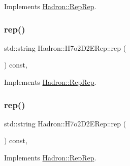 Implements \mbox{\hyperlink{structHadron_1_1RepRep_ab3213025f6de249f7095892109575fde}{Hadron\+::\+Rep\+Rep}}.

\mbox{\label{structHadron_1_1H7o2D2ERep_abd5db7339f3bf5e389260db649418d0d}} 
\subsubsection{\texorpdfstring{rep()}{rep()}\hspace{0.1cm}{\footnotesize\ttfamily [2/5]}}
{\footnotesize\ttfamily std\+::string Hadron\+::\+H7o2\+D2\+E\+Rep\+::rep (\begin{DoxyParamCaption}{ }\end{DoxyParamCaption}) const\hspace{0.3cm}{\ttfamily [inline]}, {\ttfamily [virtual]}}



Implements \mbox{\hyperlink{structHadron_1_1RepRep_ab3213025f6de249f7095892109575fde}{Hadron\+::\+Rep\+Rep}}.

\mbox{\label{structHadron_1_1H7o2D2ERep_abd5db7339f3bf5e389260db649418d0d}} 
\subsubsection{\texorpdfstring{rep()}{rep()}\hspace{0.1cm}{\footnotesize\ttfamily [3/5]}}
{\footnotesize\ttfamily std\+::string Hadron\+::\+H7o2\+D2\+E\+Rep\+::rep (\begin{DoxyParamCaption}{ }\end{DoxyParamCaption}) const\hspace{0.3cm}{\ttfamily [inline]}, {\ttfamily [virtual]}}



Implements \mbox{\hyperlink{structHadron_1_1RepRep_ab3213025f6de249f7095892109575fde}{Hadron\+::\+Rep\+Rep}}.

\mbox{\label{structHadron_1_1H7o2D2ERep_abd5db7339f3bf5e389260db649418d0d}} 
